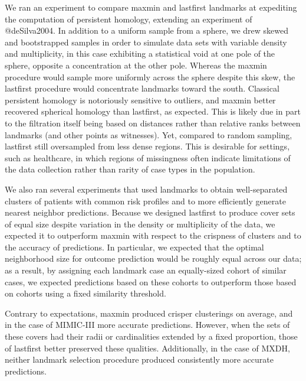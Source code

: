 \documentclass[
]{article}
\begin{document}
We ran an experiment to compare maxmin and lastfirst landmarks at
expediting the computation of persistent homology, extending an
experiment of @deSilva2004. In addition to a uniform sample from a
sphere, we drew skewed and bootstrapped samples in order to simulate
data sets with variable density and multiplicity, in this case
exhibiting a statistical void at one pole of the sphere, opposite a
concentration at the other pole. Whereas the maxmin procedure would
sample more uniformly across the sphere despite this skew, the lastfirst
procedure would concentrate landmarks toward the south. Classical
persistent homology is notoriously sensitive to outliers, and maxmin
better recovered spherical homology than lastfirst, as expected. This is
likely due in part to the filtration itself being based on distances
rather than relative ranks between landmarks (and other points as
witnesses). Yet, compared to random sampling, lastfirst still
oversampled from less dense regions. This is desirable for settings,
such as healthcare, in which regions of missingness often indicate
limitations of the data collection rather than rarity of case types in
the population.

We also ran several experiments that used landmarks to obtain
well-separated clusters of patients with common risk profiles and to
more efficiently generate nearest neighbor predictions. Because we
designed lastfirst to produce cover sets of equal size despite variation
in the density or multiplicity of the data, we expected it to outperform
maxmin with respect to the crispness of clusters and to the accuracy of
predictions. In particular, we expected that the optimal neighborhood
size for outcome prediction would be roughly equal across our data; as a
result, by assigning each landmark case an equally-sized cohort of
similar cases, we expected predictions based on these cohorts to
outperform those based on cohorts using a fixed similarity threshold.

Contrary to expectations, maxmin produced crisper clusterings on
average, and in the case of MIMIC-III more accurate predictions.
However, when the sets of these covers had their radii or cardinalities
extended by a fixed proportion, those of lastfirst better preserved
these qualities. Additionally, in the case of MXDH, neither landmark
selection procedure produced consistently more accurate predictions.
\end{document}
